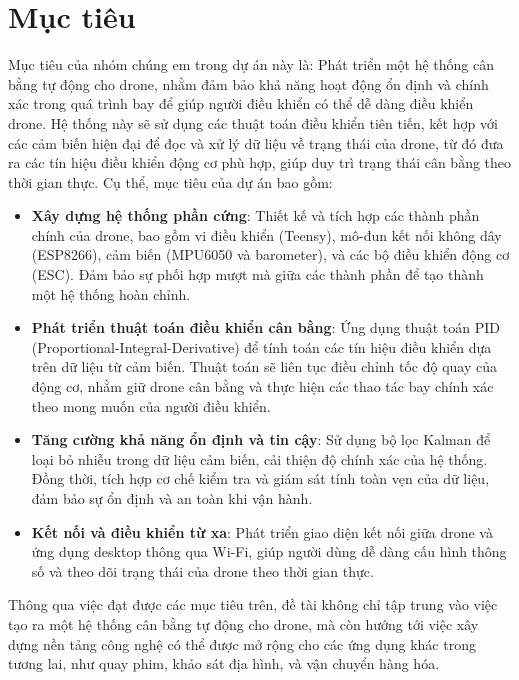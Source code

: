 \section{Mục tiêu}
\tab Mục tiêu của nhóm chúng em trong dự án này là: Phát triển một hệ thống cân bằng tự động cho drone, nhằm đảm bảo khả năng hoạt động ổn định và chính xác trong quá trình bay để giúp người điều khiển có thể dễ dàng điều khiển drone. Hệ thống này sẽ sử dụng các thuật toán điều khiển tiên tiến, kết hợp với các cảm biến hiện đại để đọc và xử lý dữ liệu về trạng thái của drone, từ đó đưa ra các tín hiệu điều khiển động cơ phù hợp, giúp duy trì trạng thái cân bằng theo thời gian thực. Cụ thể, mục tiêu của dự án bao gồm:
\begin{itemize}
    \item \textbf{Xây dựng hệ thống phần cứng}: Thiết kế và tích hợp các thành phần chính của drone, bao gồm vi điều khiển (Teensy), mô-đun kết nối không dây (ESP8266), cảm biến (MPU6050 và barometer), và các bộ điều khiển động cơ (ESC). Đảm bảo sự phối hợp mượt mà giữa các thành phần để tạo thành một hệ thống hoàn chỉnh.
    \item \textbf{Phát triển thuật toán điều khiển cân bằng}: Ứng dụng thuật toán PID (Proportional-Integral-Derivative) để tính toán các tín hiệu điều khiển dựa trên dữ liệu từ cảm biến. Thuật toán sẽ liên tục điều chỉnh tốc độ quay của động cơ, nhằm giữ drone cân bằng và thực hiện các thao tác bay chính xác theo mong muốn của người điều khiển.
    \item \textbf{Tăng cường khả năng ổn định và tin cậy}: Sử dụng bộ lọc Kalman để loại bỏ nhiễu trong dữ liệu cảm biến, cải thiện độ chính xác của hệ thống. Đồng thời, tích hợp cơ chế kiểm tra và giám sát tính toàn vẹn của dữ liệu, đảm bảo sự ổn định và an toàn khi vận hành.
    \item \textbf{Kết nối và điều khiển từ xa}: Phát triển giao diện kết nối giữa drone và ứng dụng desktop thông qua Wi-Fi, giúp người dùng dễ dàng cấu hình thông số và theo dõi trạng thái của drone theo thời gian thực.
\end{itemize}
Thông qua việc đạt được các mục tiêu trên, đề tài không chỉ tập trung vào việc tạo ra một hệ thống cân bằng tự động cho drone, mà còn hướng tới việc xây dựng nền tảng công nghệ có thể được mở rộng cho các ứng dụng khác trong tương lai, như quay phim, khảo sát địa hình, và vận chuyển hàng hóa.
